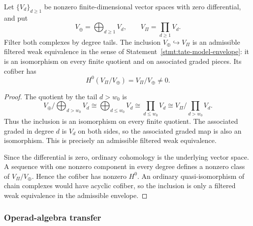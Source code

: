 \begin{lem}
\label{lem:tate-envelope-tail-boundary}
  Let \(\{V_d\}_{d\geq1}\) be nonzero finite-dimensional vector
  spaces with zero differential, and put
  \[
    V_{\oplus}=\bigoplus_{d\geq1}V_d,\qquad
    V_{\Pi}=\prod_{d\geq1}V_d .
  \]
  Filter both complexes by degree tails.  The inclusion
  \(V_{\oplus}\hookrightarrow V_{\Pi}\) is an admissible filtered weak
  equivalence in the sense of
  Statement~\ref{stmt:tate-model-envelope}: it is an isomorphism on
  every finite quotient and on associated graded pieces.  Its cofiber has
  \[
    H^0(V_{\Pi}/V_{\oplus})=V_{\Pi}/V_{\oplus}\neq0 .
  \]
\end{lem}

\begin{proof}
  The quotient by the tail \(d>w_0\) is
  \[
    V_{\oplus}/\bigoplus_{d>w_0}V_d
      \cong \bigoplus_{d\leq w_0}V_d
      \cong \prod_{d\leq w_0}V_d
      \cong V_{\Pi}/\prod_{d>w_0}V_d .
  \]
  Thus the inclusion is an isomorphism on every finite quotient.  The
  associated graded in degree \(d\) is \(V_d\) on both sides, so the
  associated graded map is also an isomorphism.  This is precisely an
  admissible filtered weak equivalence.

  Since the differential is zero, ordinary cohomology is the underlying
  vector space.  A sequence with one nonzero component in every degree
  defines a nonzero class of \(V_{\Pi}/V_{\oplus}\).  Hence the cofiber
  has nonzero \(H^0\).  An ordinary quasi-isomorphism of chain complexes
  would have acyclic cofiber, so the inclusion is only a filtered weak
  equivalence in the admissible envelope.
\end{proof}


\subsubsection{Operad-algebra transfer}

